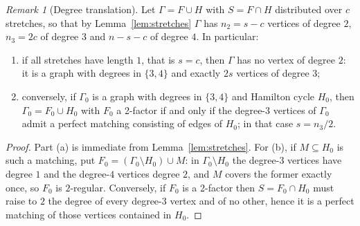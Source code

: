 \documentclass[11pt,a4paper]{article}
\theoremstyle{definition}
\theoremstyle{remark}
\newtheorem{remark}[theorem]{Remark}
\begin{document}
\begin{remark}[Degree translation]\label{rem:translation}
Let $\Gamma=F\cup H$ with $S=F\cap H$ distributed over $c$ stretches, so that by Lemma~\ref{lem:stretches} $\Gamma$ has $n_2=s-c$ vertices of degree $2$, $n_3=2c$ of degree $3$ and $n-s-c$ of degree $4$. In particular:
\begin{enumerate}[label=(\alph*)]
\item if all stretches have length $1$, that is $s=c$, then $\Gamma$ has no vertex of degree $2$: it is a graph with degrees in $\{3,4\}$ and exactly $2s$ vertices of degree $3$;
\item conversely, if $\Gamma_0$ is a graph with degrees in $\{3,4\}$ and Hamilton cycle $H_0$, then $\Gamma_0=F_0\cup H_0$ with $F_0$ a 2-factor if and only if the degree-$3$ vertices of $\Gamma_0$ admit a perfect matching consisting of edges of $H_0$; in that case $s=n_3/2$.
\end{enumerate}
\end{remark}

\begin{proof}
Part (a) is immediate from Lemma~\ref{lem:stretches}. For (b), if $M\subseteq H_0$ is such a matching, put $F_0=(\Gamma_0\setminus H_0)\cup M$: in $\Gamma_0\setminus H_0$ the degree-$3$ vertices have degree $1$ and the degree-$4$ vertices degree $2$, and $M$ covers the former exactly once, so $F_0$ is $2$-regular. Conversely, if $F_0$ is a 2-factor then $S=F_0\cap H_0$ must raise to $2$ the degree of every degree-$3$ vertex and of no other, hence it is a perfect matching of those vertices contained in $H_0$.
\end{proof}
\end{document}
